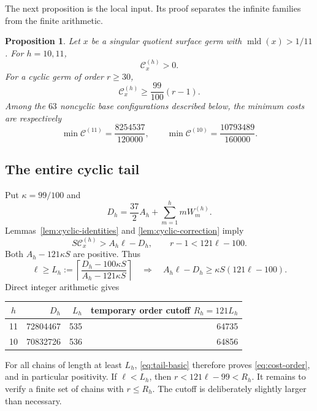 \documentclass[12pt,a4paper]{article}
\numberwithin{equation}{section}
\newtheorem{proposition}[theorem]{Proposition}
\theoremstyle{definition}
\newcommand{\mld}{\operatorname{mld}}
\newcommand{\ceil}[1]{\left\lceil#1\right\rceil}
\newcommand{\cost}{\mathcal C}
\begin{document}
The next proposition is the local input. Its proof separates the
infinite families from the finite arithmetic.

\begin{proposition}\label{prop:cost-positivity}
Let \(x\) be a singular quotient surface germ with \(\mld(x)>1/11\).
For \(h=10,11\),
\begin{equation}\label{eq:cost-positive}
                         \cost_x^{(h)}>0.
\end{equation}
For a cyclic germ of order \(r\geq30\),
\begin{equation}\label{eq:cost-order}
                   \cost_x^{(h)}\geq\frac{99}{100}(r-1).
\end{equation}
Among the \(63\) noncyclic base configurations described below, the
minimum costs are respectively
\[
 \min\cost^{(11)}=\frac{8254537}{120000},\qquad
 \min\cost^{(10)}=\frac{10793489}{160000}.
\]
\end{proposition}

\subsection{The entire cyclic tail}

Put \(\kappa=99/100\) and
\[
 D_h=\frac{37}2A_h+\sum_{m=1}^h mW_m^{(h)}.
\]
Lemmas~\ref{lem:cyclic-identities} and
\ref{lem:cyclic-correction} imply
\begin{equation}\label{eq:tail-basic}
       S\cost_x^{(h)}>A_h\ell-D_h,\qquad
       r-1<121\ell-100.
\end{equation}
Both \(A_h-121\kappa S\) are positive. Thus
\[
 \ell\geq L_h:=
 \ceil{\frac{D_h-100\kappa S}{A_h-121\kappa S}}
 \quad\Longrightarrow\quad
 A_h\ell-D_h\geq\kappa S(121\ell-100).
\]
Direct integer arithmetic gives
\begin{center}
\begin{tabular}{c|rrr}
\toprule
\(h\)&\(D_h\)&\(L_h\)&temporary order cutoff \(R_h=121L_h\)\\
\midrule
11&72804467&535&64735\\
10&70832726&536&64856\\
\bottomrule
\end{tabular}
\end{center}
For all chains of length at least \(L_h\), \eqref{eq:tail-basic}
therefore proves \eqref{eq:cost-order}, and in particular positivity.
If \(\ell<L_h\), then \(r<121\ell-99<R_h\).
It remains to verify a finite set of chains with \(r\leq R_h\).
The cutoff is deliberately slightly larger than necessary.
\end{document}
